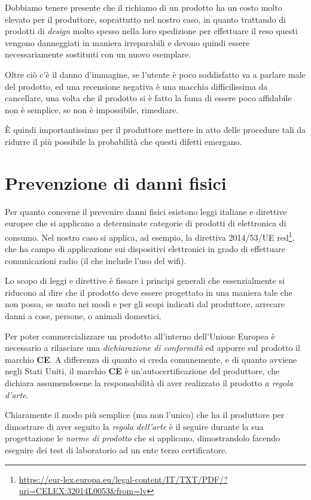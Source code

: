 \documentclass[12pt,a4paper,twoside,titlepage]{book}
\begin{document}
Dobbiamo tenere presente che il richiamo di un prodotto ha un costo molto elevato per il produttore, soprattutto 
nel nostro caso, in quanto trattando di prodotti di \textit{design} molto spesso nella loro spedizione per 
effettuare il reso questi vengono danneggiati in maniera irreparabili e devono quindi essere necessariamente 
sostituiti con un nuovo esemplare. 

Oltre ciò c'è il danno d'immagine, se l'utente è poco soddisfatto va a parlare male del prodotto, ed una 
recensione negativa è una macchia difficilissima da cancellare, una volta che il prodotto si è fatto la fama 
di essere poco affidabile non è semplice, se non è impossibile, rimediare. 

È quindi importantissimo per il produttore mettere in atto delle procedure tali da ridurre il più 
possibile la probabilità che questi difetti emergano.

\section{Prevenzione di danni fisici}

Per quanto concerne il prevenire danni fisici esistono leggi italiane e direttive europee che si applicano 
a determinate categorie di prodotti di elettronica di consumo. Nel nostro caso si applica, ad esempio, la
direttiva 2014/53/UE \acrshort{red}\footnote{\url{https://eur-lex.europa.eu/legal-content/IT/TXT/PDF/?uri=CELEX:32014L0053&from=lv}},
che ha campo di applicazione sui dispositivi elettronici in grado di 
effettuare comunicazioni radio (il che include l'uso del \Gls{wifi}). 

Lo scopo di leggi e direttive è fissare i principi generali che essenzialmente si riducono al dire che 
il prodotto deve essere progettato in una maniera tale che non possa, se usato nei modi e per gli scopi 
indicati dal produttore, arrecare danni a cose, persone, o animali domestici. 

Per poter commercializzare un prodotto all'interno dell'Unione Europea è necessario a rilasciare una 
\textit{dichiarazione di conformità} ed apporre sul prodotto il marchio \textbf{CE}. A differenza di 
quanto si creda comunemente, e di quanto avviene negli Stati Uniti, il marchio \textbf{CE} è 
un'autocertificazione del produttore, che dichiara assumendosene la responsabilità di aver realizzato 
il prodotto \textit{a regola d'arte}. 

Chiaramente il modo più semplice (ma non l'unico) che ha il produttore per dimostrare di aver seguito la
\textit{regola dell'arte} è il seguire durante la sua progettazione le \textit{norme di prodotto} che si 
applicano, dimostrandolo facendo eseguire dei test di laboratorio ad un ente terzo certificatore. 
\end{document}
